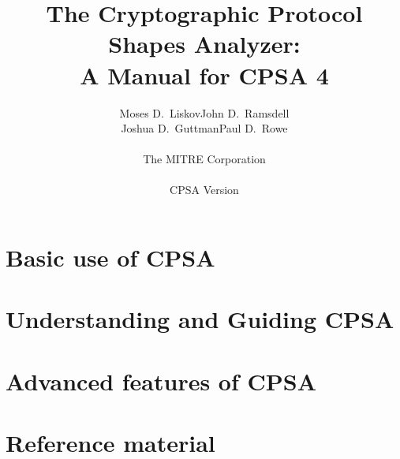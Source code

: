 \documentclass[11pt]{report}
\title{The Cryptographic Protocol Shapes Analyzer:\\ A Manual for CPSA
  4}
\author{Moses D.~Liskov\qquad John D.~Ramsdell\\Joshua D.~Guttman\qquad Paul D.~Rowe\\ \\
  {\Large The MITRE Corporation}\\ \\ CPSA Version \version}
\newif\ifpubrel
\begin{document}
\ifpubrel
\thispagestyle{title}
\fi
\maketitle
\ifpubrel
\thispagestyle{title}
\fi
{}
\cpsacopying

\tableofcontents

\listoffigures

\listoftables

\newpage
{}
\setcounter{page}{1}


\part{Basic use of CPSA}
\label{part:basic}



\part{Understanding and Guiding CPSA}
\label{part:intermediate}


\part{Advanced features of CPSA}
\label{part:advanced}


%

\part{Reference material}
\label{part:reference}







\printindex

\newpage

\end{document}
